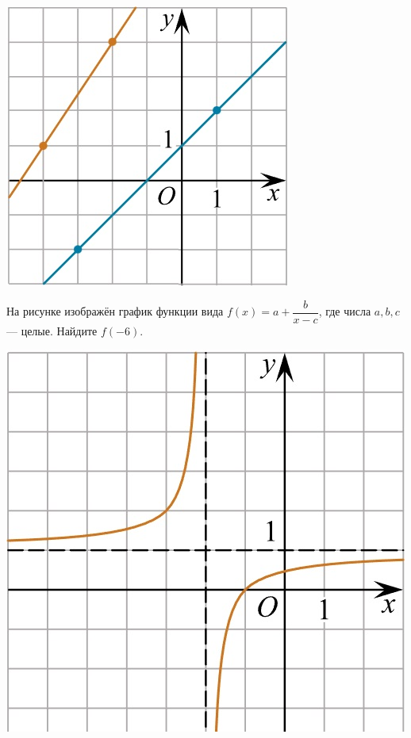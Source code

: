 \begin{homework}[number=2]
\begin{listofex}
\begin{minipage}[c]{0.1\textwidth}
			\includegraphics[align=t, width=\textwidth]{../pics/G102M4H2-2.jpg}
		\end{minipage}
		\item
		\begin{minipage}[t]{0.43\textwidth}
			На рисунке изображён график функции вида \(f(x)=a+\dfrac{b}{x-c}\), где числа \(a, b, c\) --- целые. Найдите \(f(-6)\).
		\end{minipage}
		\begin{minipage}[c]{0.1\textwidth}
			\includegraphics[align=t, width=\textwidth]{../pics/G101M4H2-10.jpg}

\end{minipage}
\end{listofex}
\end{homework}
